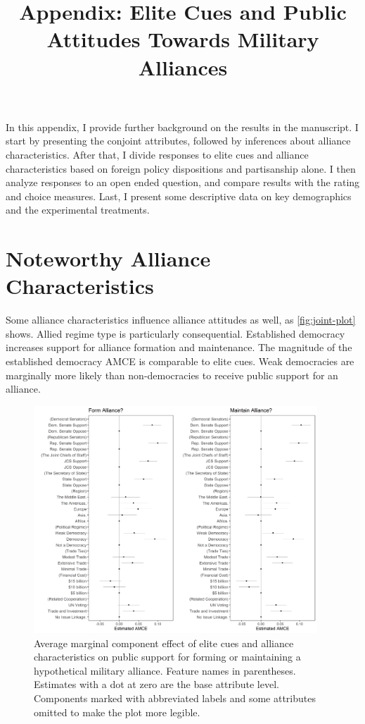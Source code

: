 \documentclass[12pt]{article}
\title{\textbf{Appendix: Elite Cues and Public Attitudes Towards Military Alliances}}
\author{}
\date{}
\begin{document}
\maketitle 

\doublespace 


In this appendix, I provide further background on the results in the manuscript. 
I start by presenting the conjoint attributes, followed by inferences about alliance characteristics. 
After that, I divide responses to elite cues and alliance characteristics based on foreign policy dispositions and partisanship alone. 
I then analyze responses to an open ended question, and compare results with the rating and choice measures.
Last, I present some descriptive data on key demographics and the experimental treatments. 


\tableofcontents

\newpage

\section{Noteworthy Alliance Characteristics}

Some alliance characteristics influence alliance attitudes as well, as \autoref{fig:joint-plot} shows. 
Allied regime type is particularly consequential. 
Established democracy increases support for alliance formation and maintenance.
The magnitude of the established democracy AMCE is comparable to elite cues.   
Weak democracies are marginally more likely than non-democracies to receive public support for an alliance.


\begin{figure}[htpb]
	\centering
		\includegraphics[width=0.95\textwidth]{joint-amce-plots.png}
	\caption{Average marginal component effect of elite cues and alliance characteristics on public support for forming or maintaining a hypothetical military alliance. Feature names in parentheses. Estimates with a dot at zero are the base attribute level. Components marked with abbreviated labels and some attributes omitted to make the plot more legible.}
	\label{fig:joint-plot}
\end{figure}
\end{document}
